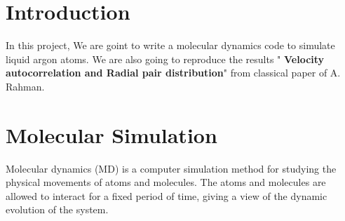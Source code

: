 \documentclass[11pt]{article}
\begin{document}
	
\vspace*{-10mm}


\vspace{3ex}



\section{Introduction}

In this project, We are goint to write a molecular dynamics code to simulate liquid argon atoms. \linebreak
We are also going to reproduce the results " {\bf Velocity autocorrelation and Radial pair distribution}" from classical paper of A. Rahman.



\section{Molecular Simulation}

Molecular dynamics (MD) is a computer simulation method for studying the physical movements of atoms and molecules. The atoms and molecules are allowed to interact for a fixed period of time, giving a view of the dynamic evolution of the system. 
\end{document}
